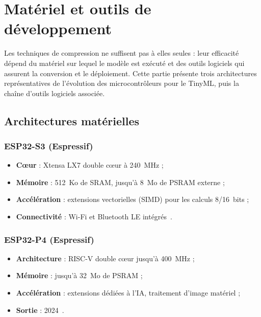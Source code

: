 \chapter{Matériel et outils de développement}
\label{ch:materiel}

Les techniques de compression ne suffisent pas à elles seules : leur efficacité
dépend du matériel sur lequel le modèle est exécuté et des outils logiciels qui
assurent la conversion et le déploiement. Cette partie présente trois
architectures représentatives de l'évolution des microcontrôleurs pour le
TinyML, puis la chaîne d'outils logiciels associée.

\section{Architectures matérielles}

\subsection{ESP32-S3 (Espressif)}
\begin{itemize}
  \item \textbf{Cœur} : Xtensa LX7 double cœur à 240~MHz ;
  \item \textbf{Mémoire} : 512~Ko de SRAM, jusqu'à 8~Mo de PSRAM externe ;
  \item \textbf{Accélération} : extensions vectorielles (SIMD) pour les calculs 8/16~bits ;
  \item \textbf{Connectivité} : Wi-Fi et Bluetooth LE intégrés~\cite{espressif-esp32s3}.
\end{itemize}

\subsection{ESP32-P4 (Espressif)}
\begin{itemize}
  \item \textbf{Architecture} : RISC-V double cœur jusqu'à 400~MHz ;
  \item \textbf{Mémoire} : jusqu'à 32~Mo de PSRAM ;
  \item \textbf{Accélération} : extensions dédiées à l'IA, traitement d'image matériel ;
  \item \textbf{Sortie} : 2024~\cite{espressif-esp32p4}.
\end{itemize}

